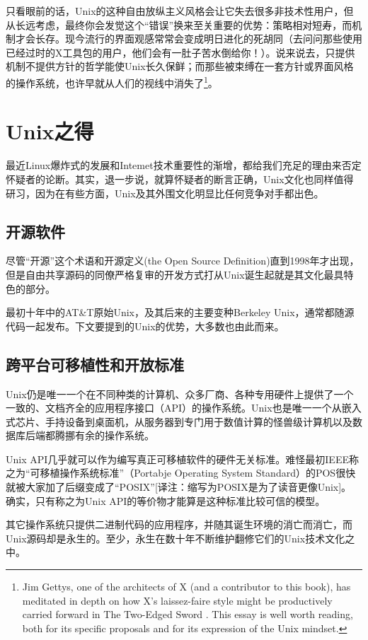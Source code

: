 \documentclass[12pt,oneside]{book}
\begin{document}
\begin{common-format}
只看眼前的话，Unix的这种自由放纵主义风格会让它失去很多非技术性用户，但从长远考虑，最终你会发觉这个“错误”换来至关重要的优势：策略相对短寿，而机制才会长存。现今流行的界面观感常常会变成明日进化的死胡同（去问问那些使用已经过时的X工具包的用户，他们会有一肚子苦水倒给你！）。说来说去，只提供机制不提供方针的哲学能使Unix长久保鲜；而那些被束缚在一套方针或界面风格的操作系统，也许早就从人们的视线中消失了\footnote{Jim Gettys, one of the architects of X (and a contributor to this book), has meditated in depth on how X's laissez-faire style might be productively carried forward in The Two-Edged Sword \cite{Gettys}. This essay is well worth reading, both for its specific proposals and for its expression of the Unix mindset.}。


\section{Unix之得}
最近Linux爆炸式的发展和Intemet技术重要性的渐增，都给我们充足的理由来否定怀疑者的论断。其实，退一步说，就算怀疑者的断言正确，Unix文化也同样值得研习，因为在有些方面，Unix及其外围文化明显比任何竞争对手都出色。

\subsection{开源软件}
尽管“开源”这个术语和开源定义(the Open Source Definition)直到1998年才出现，但是自由共享源码的同僚严格复审的开发方式打从Unix诞生起就是其文化最具特色的部分。

最初十年中的AT\&{}T原始Unix，及其后来的主要变种Berkeley Unix，通常都随源代码一起发布。下文要提到的Unix的优势，大多数也由此而来。

\subsection{跨平台可移植性和开放标准}
Unix仍是唯一一个在不同种类的计算机、众多厂商、各种专用硬件上提供了一个一致的、文档齐全的应用程序接口（API）的操作系统。Unix也是唯一一个从嵌入式芯片、手持设备到桌面机，从服务器到专门用于数值计算的怪兽级计算机以及数据库后端都腾挪有余的操作系统。

Unix API几乎就可以作为编写真正可移植软件的硬件无关标准。难怪最初IEEE称之为“可移植操作系统标准”（Portabje Operating System Standard）的POS很快就被大家加了后缀变成了“POSIX”[译注：缩写为POSIX是为了读音更像Unix]。  确实，只有称之为Unix API的等价物才能算是这种标准比较可信的模型。

其它操作系统只提供二进制代码的应用程序，并随其诞生环境的消亡而消亡，而Unix源码却是永生的。至少，永生在数十年不断维护翻修它们的Unix技术文化之中。


\end{common-format}
\end{document}
